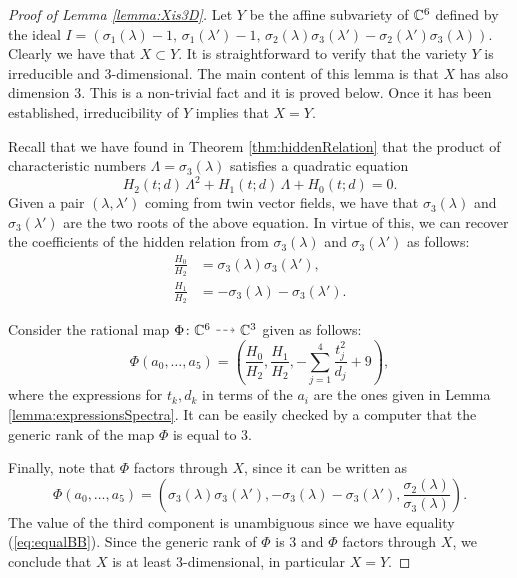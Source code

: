 \documentclass[phd,tocprelim]{cornell}
\begin{document}
\begin{proof}[Proof of Lemma \ref*{lemma:Xis3D}]
 Let $Y$ be the affine subvariety of $\mathbb{C}^6$ defined by the ideal $I=( \sigma_1(\lambda)-1,\, \sigma_1(\lambda')-1,\,  \sigma_2(\lambda)\sigma_3(\lambda')-\sigma_2(\lambda')\sigma_3(\lambda) )$. Clearly we have that $X\subset Y$. It is straightforward to verify that the variety $Y$ is irreducible and 3-dimensional. The main content of this lemma is that $X$ has also dimension 3. This is a non-trivial fact and it is proved below. Once it has been established, irreducibility of $Y$ implies that $X=Y$.
 
 Recall that we have found in Theorem \ref{thm:hiddenRelation} that the product of characteristic numbers $\Lambda=\sigma_3(\lambda)$ satisfies a quadratic equation
  \[ H_2(t;d)\,\Lambda^2+H_1(t;d)\,\Lambda+H_0(t;d)=0 . \]
 Given a pair $(\lambda,\lambda')$ coming from twin vector fields, we have that $\sigma_3(\lambda)$ and $\sigma_3(\lambda')$ are the two roots of the above equation. In virtue of this, we can recover the coefficients of the hidden relation from $\sigma_3(\lambda)$ and $\sigma_3(\lambda')$ as follows:
 \begin{align*}
  \frac{H_0}{H_2} &= \sigma_3(\lambda)\sigma_3(\lambda'), \\
  \frac{H_1}{H_2} &= -\sigma_3(\lambda)-\sigma_3(\lambda').
 \end{align*}

 Consider the rational map $\Phi\colon\C^6\dashedArrow\C^3$ given as follows: 
  \[ \Phi(a_0,\ldots,a_5)=\left( \frac{H_0}{H_2}, \frac{H_1}{H_2}, -\sum_{j=1}^4\frac{t_j^2}{d_j} +9 \right), \]
 where the expressions for $t_k,d_k$ in terms of the $a_i$ are the ones given in Lemma \ref{lemma:expressionsSpectra}. It can be easily checked by a computer that the generic rank of the map $\Phi$ is equal to 3.
 
 Finally, note that $\Phi$ factors through $X$, since it can be written as
  \[ \Phi(a_0,\ldots,a_5)=\left( \sigma_3(\lambda)\sigma_3(\lambda'), -\sigma_3(\lambda)-\sigma_3(\lambda'), \frac{\sigma_2(\lambda)}{\sigma_3(\lambda)} \right). \]
 The value of the third component is unambiguous since we have equality (\ref{eq:equalBB}). Since the generic rank of $\Phi$ is 3 and $\Phi$ factors through $X$, we conclude that $X$ is at least 3-dimensional, in particular $X=Y$.  
\end{proof}
\end{document}
